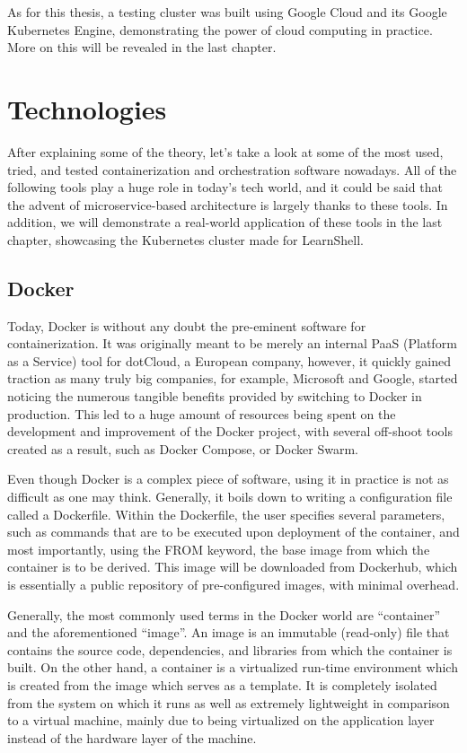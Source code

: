 \documentclass[thesis=B,english]{FITthesis}[2019/12/23]
\begin{document}
As for this thesis, a testing cluster was built using Google Cloud and its Google Kubernetes Engine, demonstrating the power of cloud computing in practice. More on this will be revealed in the last chapter.


\section{Technologies}

After explaining some of the theory, let's take a look at some of the most used, tried, and tested containerization and orchestration software nowadays. All of the following tools play a huge role in today's tech world, and it could be said that the advent of microservice-based architecture is largely thanks to these tools. In addition, we will demonstrate a real-world application of these tools in the last chapter, showcasing the Kubernetes cluster made for LearnShell.

\subsection{Docker}

Today, Docker is without any doubt the pre-eminent software for containerization. It was originally meant to be merely an internal PaaS (Platform as a Service) tool for dotCloud, a European company, however, it quickly gained traction as many truly big companies, for example, Microsoft and Google, started noticing the numerous tangible benefits provided by switching to Docker in production. \cite{docker-java} This led to a huge amount of resources being spent on the development and improvement of the Docker project, with several off-shoot tools created as a result, such as Docker Compose, or Docker Swarm.

Even though Docker is a complex piece of software, using it in practice is not as difficult as one may think. Generally, it boils down to writing a configuration file called a Dockerfile. Within the Dockerfile, the user specifies several parameters, such as commands that are to be executed upon deployment of the container, and most importantly, using the FROM keyword, the base image from which the container is to be derived. This image will be downloaded from Dockerhub, which is essentially a public repository of pre-configured images, with minimal overhead. 

Generally, the most commonly used terms in the Docker world are “container” and the aforementioned “image”. An image is an immutable (read-only) file that contains the source code, dependencies, and libraries from which the container is built. On the other hand, a container is a virtualized run-time environment which is created from the image which serves as a template. \cite{docker-phoenix} It is completely isolated from the system on which it runs as well as extremely lightweight in comparison to a virtual machine, mainly due to being virtualized on the application layer instead of the hardware layer of the machine. 
\end{document}
